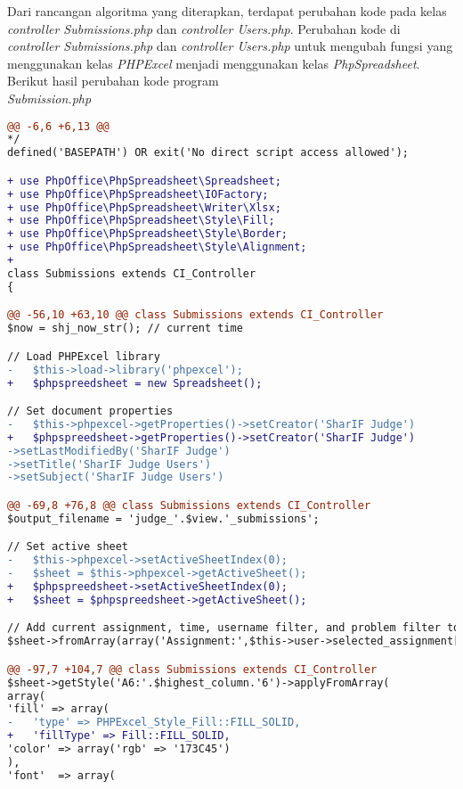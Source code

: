 	Dari rancangan algoritma yang diterapkan, terdapat perubahan kode pada kelas \textit{controller Submissions.php} dan \textit{controller Users.php}. Perubahan kode di \textit{controller Submissions.php} dan \textit{controller Users.php} untuk mengubah fungsi yang menggunakan kelas \textit{PHPExcel} menjadi menggunakan kelas \textit{PhpSpreadsheet}. Berikut hasil perubahan kode program
~\\	
	\textit{Submission.php}
\begin{lstlisting}[language=diff, basicstyle=\ttfamily, frame=single,
columns=fullflexible, keepspaces=true, breaklines=true]
@@ -6,6 +6,13 @@
*/
defined('BASEPATH') OR exit('No direct script access allowed');

+ use PhpOffice\PhpSpreadsheet\Spreadsheet;
+ use PhpOffice\PhpSpreadsheet\IOFactory;
+ use PhpOffice\PhpSpreadsheet\Writer\Xlsx;
+ use PhpOffice\PhpSpreadsheet\Style\Fill;
+ use PhpOffice\PhpSpreadsheet\Style\Border;
+ use PhpOffice\PhpSpreadsheet\Style\Alignment;
+ 
class Submissions extends CI_Controller
{

@@ -56,10 +63,10 @@ class Submissions extends CI_Controller
$now = shj_now_str(); // current time

// Load PHPExcel library
-   $this->load->library('phpexcel');
+   $phpspreedsheet = new Spreadsheet();

// Set document properties
-   $this->phpexcel->getProperties()->setCreator('SharIF Judge')
+   $phpspreedsheet->getProperties()->setCreator('SharIF Judge')
->setLastModifiedBy('SharIF Judge')
->setTitle('SharIF Judge Users')
->setSubject('SharIF Judge Users')

@@ -69,8 +76,8 @@ class Submissions extends CI_Controller
$output_filename = 'judge_'.$view.'_submissions';

// Set active sheet
-   $this->phpexcel->setActiveSheetIndex(0);
-   $sheet = $this->phpexcel->getActiveSheet();
+   $phpspreedsheet->setActiveSheetIndex(0);
+   $sheet = $phpspreedsheet->getActiveSheet();

// Add current assignment, time, username filter, and problem filter to document
$sheet->fromArray(array('Assignment:',$this->user->selected_assignment['name']), null, 'A1', true);

@@ -97,7 +104,7 @@ class Submissions extends CI_Controller
$sheet->getStyle('A6:'.$highest_column.'6')->applyFromArray(
array(
'fill' => array(
-   'type' => PHPExcel_Style_Fill::FILL_SOLID,
+   'fillType' => Fill::FILL_SOLID,
'color' => array('rgb' => '173C45')
),
'font'  => array(


\end{lstlisting}
